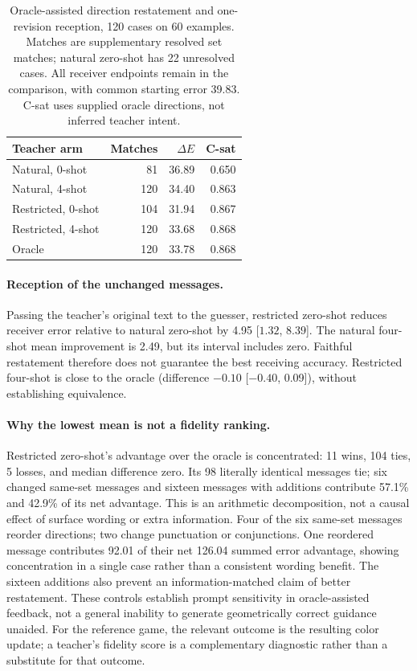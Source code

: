 \documentclass[11pt]{article}
\begin{document}
\begin{table}[t]
\centering\small
\begin{tabular}{@{}lrrr@{}}
\toprule
Teacher arm & Matches & $\Delta E$ & C-sat \\
\midrule
Natural, 0-shot & 81 & 36.89 & 0.650 \\
Natural, 4-shot & 120 & 34.40 & 0.863 \\
Restricted, 0-shot & 104 & 31.94 & 0.867 \\
Restricted, 4-shot & 120 & 33.68 & 0.868 \\
Oracle & 120 & 33.78 & 0.868 \\
\bottomrule
\end{tabular}
\caption{Oracle-assisted direction restatement and one-revision reception,
120 cases on 60 examples. Matches are supplementary resolved set matches;
natural zero-shot has 22 unresolved cases. All receiver endpoints remain in
the comparison, with common starting error 39.83. C-sat uses supplied oracle
directions, not inferred teacher intent.}
\label{tab:teacher_receiver}
\end{table}

\paragraph{Reception of the unchanged messages.}
Passing the teacher's original text to the guesser, restricted zero-shot
reduces receiver error relative to natural zero-shot
by 4.95 [$1.32$, $8.39$]. The natural four-shot mean improvement is 2.49,
but its interval includes zero. Faithful restatement therefore does not
guarantee the best receiving accuracy. Restricted four-shot is close to the
oracle (difference $-0.10$ [$-0.40$, 0.09]), without establishing equivalence.

\paragraph{Why the lowest mean is not a fidelity ranking.}
Restricted zero-shot's advantage over the oracle is concentrated:
11 wins, 104 ties, 5 losses, and median difference zero.
Its 98 literally identical messages tie; six changed same-set messages and
sixteen messages with additions contribute 57.1\% and 42.9\% of its net
advantage. This is an arithmetic decomposition, not a causal effect of
surface wording or extra information. Four of the six same-set messages
reorder directions; two change punctuation or conjunctions. One reordered
message contributes 92.01 of their net 126.04 summed error advantage,
showing concentration in a single case rather than a consistent wording
benefit. The sixteen additions also prevent an
information-matched claim of better restatement.
These controls establish prompt sensitivity in oracle-assisted feedback,
not a general inability to generate geometrically correct guidance unaided.
For the reference game, the relevant outcome is the resulting color
update; a teacher's fidelity score is a complementary diagnostic rather
than a substitute for that outcome.
\end{document}
